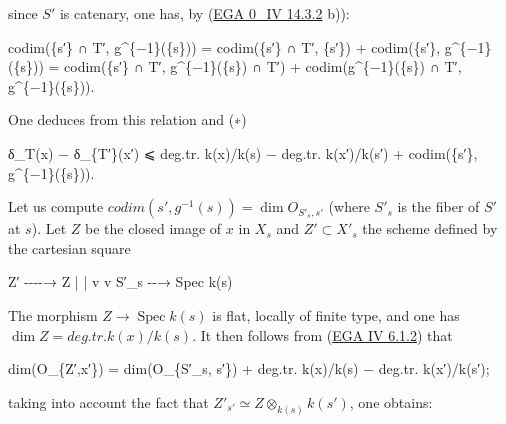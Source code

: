 \documentclass[
  11pt,
  a4paper,
]{book}
\newenvironment{Shaded}{}{}
\newcommand{\NormalTok}[1]{#1}
\begin{document}
since \(S'\) is catenary, one has, by
(\href{https://jcreinhold.github.io/ega/iv/01-ch0-14-combinatorial-dimension.html\#143-the-chain-condition}{EGA
0\_IV 14.3.2} b)):

\begin{Shaded}
\begin{Highlighting}[]
\NormalTok{codim(\{s′\} ∩ T′, g\^{}\{−1\}(\{s\})) = codim(\{s′\} ∩ T′, \{s′\}) + codim(\{s′\}, g\^{}\{−1\}(\{s\}))}
\NormalTok{   = codim(\{s′\} ∩ T′, g\^{}\{−1\}(\{s\}) ∩ T′) + codim(g\^{}\{−1\}(\{s\}) ∩ T′, g\^{}\{−1\}(\{s\})).}
\end{Highlighting}
\end{Shaded}

One deduces from this relation and (∗)

\begin{Shaded}
\begin{Highlighting}[]
\NormalTok{δ\_T(x) − δ\_\{T′\}(x′) ⩽ deg.tr. k(x)/k(s) − deg.tr. k(x′)/k(s′) + codim(\{s′\}, g\^{}\{−1\}(\{s\})).}
\end{Highlighting}
\end{Shaded}

Let us compute \(codim({s'}, g^{-1}({s})) = \dim O_{S'_{s}, s'}\) (where
\(S'_{s}\) is the fiber of \(S'\) at \(s\)). Let \(Z\) be the closed
image of \(x\) in \(X_{s}\) and \(Z' \subset X'_{s}\) the scheme defined
by the cartesian square

\begin{Shaded}
\begin{Highlighting}[]
\NormalTok{Z′ {-}{-}{-}{-}→ Z}
\NormalTok{|        |}
\NormalTok{v        v}
\NormalTok{S′\_s {-}{-}→ Spec k(s)}
\end{Highlighting}
\end{Shaded}

The morphism \(Z \to \operatorname{Spec} k(s)\) is flat, locally of
finite type, and one has \(\dim Z = deg.tr. k(x)/k(s)\). It then follows
from
(\href{https://jcreinhold.github.io/ega/iv/18-ch4-06-flat-morphisms.html\#61-flatness-and-dimension}{EGA
IV 6.1.2}) that

\begin{Shaded}
\begin{Highlighting}[]
\NormalTok{dim(O\_\{Z′,x′\}) = dim(O\_\{S′\_s, s′\}) + deg.tr. k(x)/k(s) − deg.tr. k(x′)/k(s′);}
\end{Highlighting}
\end{Shaded}

taking into account the fact that
\(Z'_{s'} \simeq Z \otimes_{k(s)} k(s')\), one obtains:
\end{document}
